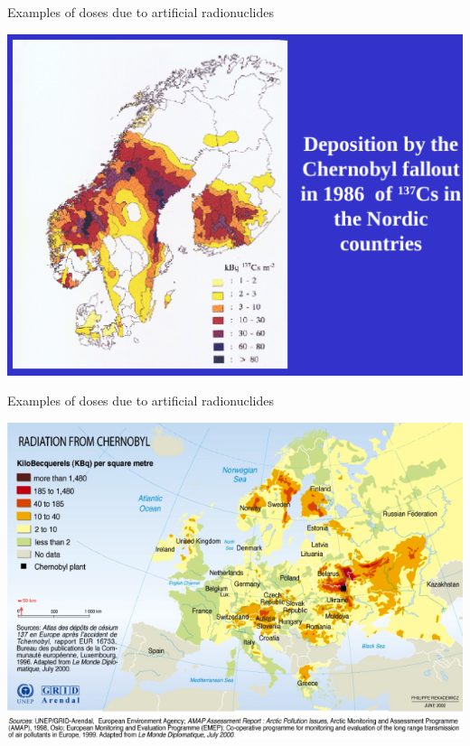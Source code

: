 \begin{frame}{Examples of doses due to artificial radionuclides}

\centering
\includegraphics[scale=0.25]{figures/fallout.png}

\end{frame}

\begin{frame}{Examples of doses due to artificial radionuclides}

\centering
\includegraphics[scale=0.5]{figures/fallouteurope}

\end{frame}


